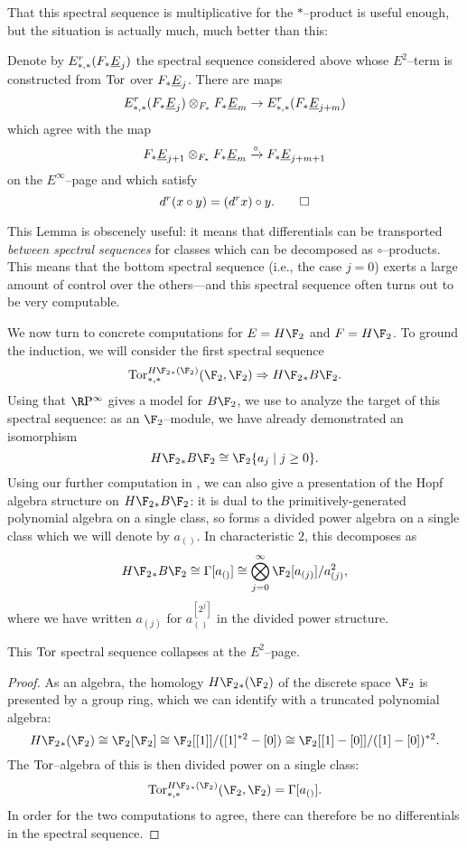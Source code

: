 That this spectral sequence is multiplicative for the $\ast$--product is useful enough, but the situation is actually much, much better than this:
\begin{lemma}\label{CircProductAndDifferentials}
Denote by $E^r_{*, *}(F_* \underline{\smash{E}}_{j})$ the spectral sequence considered above whose $E^2$--term is constructed from $\operatorname{Tor}$ over $F_* \underline{\smash{E}}_{j}$.  There are maps \[E^r_{*, *}(F_* \underline{\smash{E}}_{j}) \otimes_{F_*} F_* \underline{\smash{E}}_{m} \to E^r_{*, *}(F_* \underline{\smash{E}}_{j+m})\] which agree with the map \[F_* \underline{\smash{E}}_{j+1} \otimes_{F_*} F_* \underline{\smash{E}}_{m} \xrightarrow{\circ} F_* \underline{\smash{E}}_{j+m+1}\] on the $E^\infty$--page and which satisfy \[d^r(x \circ y) = (d^r x) \circ y. \qed\]
\end{lemma}
\noindent This Lemma is obscenely useful: it means that differentials can be transported \emph{between spectral sequences} for classes which can be decomposed as $\circ$--products.  This means that the bottom spectral sequence (i.e., the case $j = 0$) exerts a large amount of control over the others---and this spectral sequence often turns out to be very computable.

We now turn to concrete computations for $E = H\F_2$ and $F = H\F_2$.  To ground the induction, we will consider the first spectral sequence \[\Tor^{H\F_2{}_*(\F_2)}_{*, *}(\F_2, \F_2) \Rightarrow H\F_2{}_* B\F_2.\]  Using that $\RP^\infty$ gives a model for $B\F_2$, we use  to analyze the target of this spectral sequence: as an $\F_2$--module, we have already demonstrated an isomorphism \[H\F_2{}_* B\F_2 \cong \F_2\{a_j \mid j \ge 0\}.\]  Using our further computation in , we can also give a presentation of the Hopf algebra structure on $H\F_2{}_* B\F_2$: it is dual to the primitively-generated polynomial algebra on a single class, so forms a divided power algebra on a single class which we will denote by $a_{()}$.  In characteristic $2$, this decomposes as \[H\F_2{}_* B\F_2 \cong \Gamma[a_{()}] \cong \bigotimes_{j=0}^\infty \F_2[a_{(j)}] / a_{(j)}^2,\] where we have written $a_{(j)}$ for $a_{()}^{[2^j]}$ in the divided power structure.

\begin{corollary}
This $\operatorname{Tor}$ spectral sequence collapses at the $E^2$--page.
\end{corollary}
\begin{proof}
As an algebra, the homology $H\F_2{}_*(\F_2)$ of the discrete space $\F_2$ is presented by a group ring, which we can identify with a truncated polynomial algebra: \[H\F_2{}_*(\F_2) \cong \F_2[\F_2] \cong \F_2[[1]] / ([1]^{\ast 2} - [0]) \cong \F_2[[1] - [0]] / ([1] - [0])^{\ast 2}.\]  The $\operatorname{Tor}$--algebra of this is then divided power on a single class: \[\Tor^{H\F_2{}_*(\F_2)}_{*, *}(\F_2, \F_2) = \Gamma[a_{()}].\]  In order for the two computations to agree, there can therefore be no differentials in the spectral sequence.
\end{proof}

